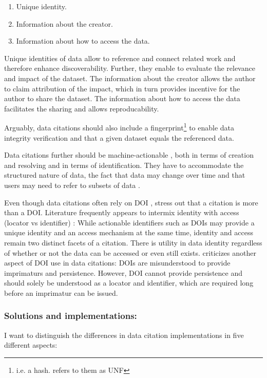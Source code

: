 \documentclass[a4paper,10pt]{article}
\begin{document}
\begin{enumerate}
 \item Unique identity.
 \item Information about the creator.
 \item Information about how to access the data.
\end{enumerate}

Unique identities of data allow to reference and connect related work and therefore enhance discoverability. Further, they enable to evaluate the relevance and impact of the dataset. The information about the creator allows the author to claim attribution of the impact, which in turn provides incentive for the author to share the dataset. The information about how to access the data facilitates the sharing and allows reproducability.

Arguably, data citations should also include a fingerprint\footnote{i.e. a hash. \citep{Crosas2011} refers to them as \gls{UNF}} to enable data integrity verification \citep{Crosas2011} and that a given dataset equals the referenced data.

Data citations further should be machine-actionable \citep{Assante2016, Altman2015, Buneman2016}, both in terms of creation and resolving and in terms of identification.
They have to accommodate the structured nature of data, the fact that data may change over time and that users may need to refer to subsets of data \citep{Buneman2010}.

Even though data citations often rely on \gls{DOI} \citep{Castelli2013}, \cite{Buneman2010} stress out that a citation is more than a \gls{DOI}.
Literature frequently appears to intermix identity with access (locator vs identifier) \citep{ESIP2012a}: While actionable identifiers such as \glspl{DOI} may provide a unique identity and an access mechanism at the same time, identity and access remain two distinct facets of a citation. There is utility in data identity regardless of whether or not the data can be accessed or even still exists.
\Cite{Parsons2013a} criticizes another aspect of \gls{DOI} use in data citations: \Glspl{DOI} are misunderstood to provide imprimaturs and persistence. However, \gls{DOI} cannot provide persistence and should solely be understood as a locator and identifier, which are required long before an imprimatur can be issued.

\newpage
\subsubsection{Solutions and implementations:}
I want to distinguish the differences in data citation implementations in five different aspects:
\end{document}
